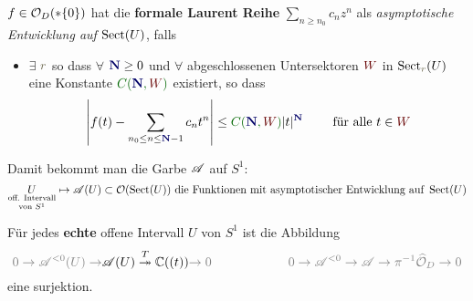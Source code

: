 \begin{defn}
  \def\myN{\textbf{\textcolor{blue!40!black}{N}}}
  \def\mySect{\textcolor{red!40!black}{W}}
  \def\myConst{\textcolor{green!40!black}{C(\myN,\mySect)}}
  $f\in\mathcal{O}_D(*\{0\})$ hat die \textbf{formale Laurent Reihe}
  $\sum_{n\geq n_0}c_nz^n$ als \emph{asymptotische Entwicklung auf
  $\operatorname{Sect}(U)$}, falls
  \begin{itemize}
    \item $\exists$ $\textcolor{yellow!30!black}{r}$ so dass
      $\forall$ $\myN\geq0$ und
      $\forall$ abgeschlossenen Untersektoren $\mySect$ in
      $\Sect_{\textcolor{yellow!30!black}{r}}(U)$
      \\eine Konstante $\myConst$ existiert, so dass
      \[
        \left|
          f(t)-\sum_{n_0\leq n\leq\myN-1}c_nt^n
        \right|
        \leq \myConst|t|^{\myN} \qquad \text{ für alle } t\in \mySect
      \]

      \begin{comment}
        oder äquivalent:
        $\lim_{z\to0,z\in{\mySect}}|t|^{-(\myN-1)}
          \left|
            f(t)-\sum_{n_0\leq n\leq \myN-1}c_nt^n
          \right|=0$
      \end{comment}
  \end{itemize}
  Damit bekommt man die Garbe $\mathscr{A}$ auf $S^1$:
  \[
    \underset{\text{von } S^1}{\underset{\text{off. Intervall}}{U}}
    \mapsto\mathscr{A}(U)
    \subset\mathcal{O}(\operatorname{Sect}(U)) \text{ die Funktionen mit asymptotischer
    Entwicklung auf } \operatorname{Sect}(U)
  \]
  \TODO[Garbe auf $\tilde D=S^1\times[0,r)$ anstatt auf $S^1$]
\end{defn}
\begin{lem}
  Für jedes \textbf{echte} offene Intervall $U$ von $S^1$ ist die Abbildung
  \[
    \textcolor{gray}{0\to \sA^{<0}(U) \to}
    \sA(U) \overset{T}\twoheadrightarrow \C((t))
    \textcolor{gray}{\to0}
    \qquad
    \qquad
    \qquad
    \textcolor{gray}{0\to \sA^{<0} \to
    \sA \to \pi^{-1}\hat\cO_{D}
    \to0}
  \]
  eine surjektion.
\end{lem}
